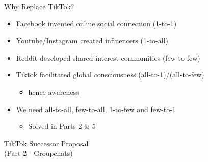 \documentclass[aspectratio=169]{beamer}
\begin{document}
\begin{frame}{Why Replace TikTok?}
\vspace{-0.7in}
\begin{itemize}
    \item Facebook invented online social connection (1-to-1)
    \item Youtube/Instagram created influencers (1-to-all)
    \item Reddit developed shared-interest communities (few-to-few)
    \item Tiktok facilitated global consciousness (all-to-1)/(all-to-few)
    \begin{itemize}
        \item hence  awareness
    \end{itemize}
    \item We need all-to-all, few-to-all, 1-to-few and few-to-1
    \begin{itemize}
        \item Solved in Parts 2 \& 5
    \end{itemize}
\end{itemize}
\end{frame}

\begin{frame}
    \centering
    \Huge TikTok Successor Proposal \\
    \Huge (Part 2 - Groupchats)
\end{frame}
\end{document}
